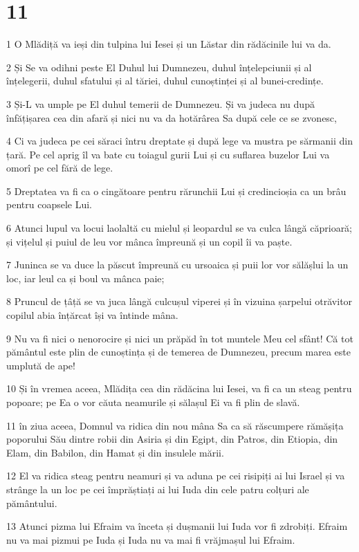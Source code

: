 \chapter{11}

\par 1 O Mlădiță va ieși din tulpina lui Iesei și un Lăstar din rădăcinile lui va da.
\par 2 Și Se va odihni peste El Duhul lui Dumnezeu, duhul înțelepciunii și al înțelegerii, duhul sfatului și al tăriei, duhul cunoștinței și al bunei-credințe.
\par 3 Și-L va umple pe El duhul temerii de Dumnezeu. Și va judeca nu după înfățișarea cea din afară și nici nu va da hotărârea Sa după cele ce se zvonesc,
\par 4 Ci va judeca pe cei săraci întru dreptate și după lege va mustra pe sărmanii din țară. Pe cel aprig îl va bate cu toiagul gurii Lui și cu suflarea buzelor Lui va omorî pe cel fără de lege.
\par 5 Dreptatea va fi ca o cingătoare pentru rărunchii Lui și credincioșia ca un brâu pentru coapsele Lui.
\par 6 Atunci lupul va locui laolaltă cu mielul și leopardul se va culca lângă căprioară; și vițelul și puiul de leu vor mânca împreună și un copil îi va paște.
\par 7 Juninca se va duce la păscut împreună cu ursoaica și puii lor vor sălășlui la un loc, iar leul ca și boul va mânca paie;
\par 8 Pruncul de țâță se va juca lângă culcușul viperei și în vizuina șarpelui otrăvitor copilul abia înțărcat își va întinde mâna.
\par 9 Nu va fi nici o nenorocire și nici un prăpăd în tot muntele Meu cel sfânt! Că tot pământul este plin de cunoștința și de temerea de Dumnezeu, precum marea este umplută de ape!
\par 10 Și în vremea aceea, Mlădița cea din rădăcina lui Iesei, va fi ca un steag pentru popoare; pe Ea o vor căuta neamurile și sălașul Ei va fi plin de slavă.
\par 11 în ziua aceea, Domnul va ridica din nou mâna Sa ca să răscumpere rămășița poporului Său dintre robii din Asiria și din Egipt, din Patros, din Etiopia, din Elam, din Babilon, din Hamat și din insulele mării.
\par 12 El va ridica steag pentru neamuri și va aduna pe cei risipiți ai lui Israel și va strânge la un loc pe cei împrăștiați ai lui Iuda din cele patru colțuri ale pământului.
\par 13 Atunci pizma lui Efraim va înceta și dușmanii lui Iuda vor fi zdrobiți. Efraim nu va mai pizmui pe Iuda și Iuda nu va mai fi vrăjmașul lui Efraim.
